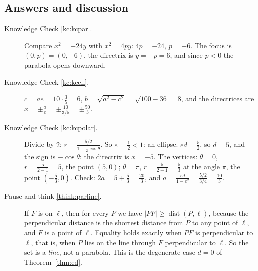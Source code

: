 \documentclass[11pt]{article}
\begin{document}
\subsection*{Answers and discussion}

\begin{description}

  \item[Knowledge Check \ref{kc:kcpar}.] Compare $x^2=-24y$ with $x^2=4py$: $4p=-24$, $p=-6$. The focus is $(0,p)=(0,-6)$, the directrix is $y=-p=6$, and since $p<0$ the parabola opens downward.

  \item[Knowledge Check \ref{kc:kcell}.] $c=ae=10\cdot\frac35=6$, $b=\sqrt{a^2-c^2}=\sqrt{100-36}=8$, and the directrices are $x=\pm\frac ae=\pm\frac{10}{3/5}=\pm\frac{50}3$.

  \item[Knowledge Check \ref{kc:kcpolar}.] Divide by $2$: $r=\frac{5/2}{1-\frac12\cos\theta}$. So $e=\frac12<1$: an ellipse. $ed=\frac52$, so $d=5$, and the sign is $-\cos\theta$: the directrix is $x=-5$. The vertices: $\theta=0$, $r=\frac{5}{2-1}=5$, the point $(5,0)$; $\theta=\pi$, $r=\frac5{2+1}=\frac53$ at the angle $\pi$, the point $\left(-\frac53,0\right)$. Check: $2a=5+\frac53=\frac{20}3$, and $a=\frac{ed}{1-e^2}=\frac{5/2}{3/4}=\frac{10}3$.

  \item[Pause and think \ref{think:parline}.] If $F$ is on $\ell$, then for every $P$ we have $\lvert PF\rvert\ge\operatorname{dist}(P,\ell)$, because the perpendicular distance is the shortest distance from $P$ to any point of $\ell$, and $F$ is a point of $\ell$. Equality holds exactly when $PF$ is perpendicular to $\ell$, that is, when $P$ lies on the line through $F$ perpendicular to $\ell$. So the set is a \emph{line}, not a parabola. This is the degenerate case $d=0$ of Theorem~\ref{thm:ed}.


\end{description}
\end{document}
